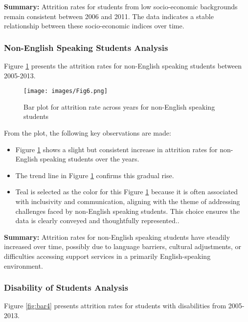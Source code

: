 \documentclass[conference]{IEEEtran}
\begin{document}
\textbf{Summary:} Attrition rates for students from low socio-economic backgrounds remain consistent between 2006 and 2011. The data indicates a stable relationship between these socio-economic indices over time.

\subsubsection{Non-English Speaking Students Analysis}

Figure \ref{fig:bar3} presents the attrition rates for non-English speaking students between 2005-2013.

\begin{figure}[H] 
    \centering 
    \texttt{[image: images/Fig6.png]} 
    \caption{Bar plot for attrition rate across years for non-English speaking students} 
    \label{fig:bar3}
\end{figure}

\par From the plot, the following key observations are made: \begin{itemize} 
    \item Figure \ref{fig:bar3} shows a slight but consistent increase in attrition rates for non-English speaking students over the years. \item The trend line in Figure \ref{fig:bar3} confirms this gradual rise. 
    \item Teal is selected as the color for this Figure \ref{fig:bar3} because it is often associated with inclusivity and communication, aligning with the theme of addressing challenges faced by non-English speaking students. This choice ensures the data is clearly conveyed and thoughtfully represented..

\end{itemize}

\textbf{Summary:} Attrition rates for non-English speaking students have steadily increased over time, possibly due to language barriers, cultural adjustments, or difficulties accessing support services in a primarily English-speaking environment.

\subsubsection{Disability of Students Analysis}

Figure \ref{fig:bar4} presents attrition rates for students with disabilities from 2005-2013.
\end{document}
